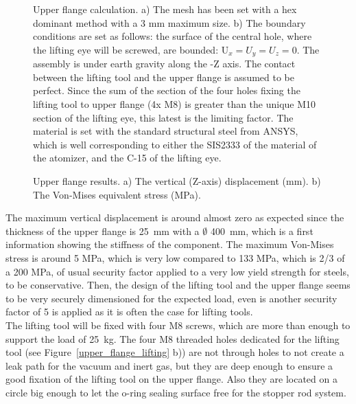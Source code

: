 \documentclass[../main.tex]{subfiles}
\begin{document}
\vspace{0mm}
\begin{figure}[H]
    \centering
        
        \caption[Upper flange calculation]{Upper flange calculation. a) The mesh has been set with a hex dominant method with a 3 mm maximum size. b) The boundary conditions are set as follows: the surface of the central hole, where the lifting eye will be screwed, are bounded: U$_{x}=U_{y}=U_{z}=0$. The assembly is under earth gravity along the -Z axis. The contact between the lifting tool and the upper flange is assumed to be perfect. Since the sum of the section of the four holes fixing the lifting tool to upper flange (4x M8) is greater than the unique M10 section of the lifting eye, this latest is the limiting factor. The material is set with the standard structural steel from ANSYS, which is well corresponding to either the SIS2333 of the material of the atomizer, and the C-15 of the lifting eye.}
        \label{upper_flange_cd}
\end{figure}
\FloatBarrier
\vspace{0mm}

\vspace{0mm}
\begin{figure}[H]
    \centering
        
        \caption[Upper flange results]{Upper flange results. a) The vertical (Z-axis) displacement (mm). b) The Von-Mises equivalent stress (MPa).}
        \label{upper_flange_results}
\end{figure}
\FloatBarrier
\vspace{0mm}

The maximum vertical displacement is around almost zero as expected since the thickness of the upper flange is 25~mm with a $\emptyset$ 400~mm, which is a first information showing the stiffness of the component. The maximum Von-Mises stress is around 5 MPa,  which is very low compared to 133 MPa, which is 2/3 of a 200 MPa, of usual security factor applied to a very low yield strength for steels, to be conservative. Then, the design of the lifting tool and the upper flange seems to be very securely dimensioned for the expected load, even is another security factor of 5 is applied as it is often the case for lifting tools.\\

The lifting tool will be fixed with four M8 screws, which are more than enough to support the load of 25~kg. The four M8 threaded holes dedicated for the lifting tool (see Figure~\ref{upper_flange_lifting} b)) are not through holes to not create a leak path for the vacuum and inert gas, but they are deep enough to ensure a good fixation of the lifting tool on the upper flange. Also they are located on a circle big enough to let the o-ring sealing surface free for the stopper rod system.
\end{document}
